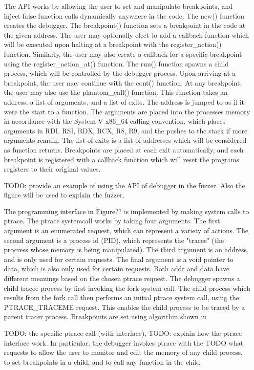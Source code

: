 \documentclass{article} \usepackage{graphicx}
\begin{document}
The API works by allowing the user to set and manipulate breakpoints, and inject
false function calls dynamically anywhere in the code. The new() function
creates the debugger. The breakpoint() function sets a breakpoint in the code at
the given address. The user may optionally elect to add a callback function
which will be executed upon halting at a breakpoint with the register_action()
function. Similarly, the user may also create a callback for a specific
breakpoint using the register_action_at() function. The run() function spawns a
child process, which will be controlled by the debugger process. Upon arriving
at a breakpoint, the user may continue with the cont() function. At any
breakpoint, the user may also use the phantom_call() function. This function
takes an address, a list of arguments, and a list of exits. The address is
jumped to as if it were the start to a function. The arguments are placed into
the processes memory in accordance with the System V x86_64 calling convention,
which places arguments in RDI, RSI, RDX, RCX, R8, R9, and the pushes to the stack if
more arguments remain. The list of exits is a list of addresses which will be
considered as function returns. Breakpoints are placed at each exit
automatically, and each breakpoint is registered with a callback function which
will reset the programs registers to their original values.

TODO: provide an example of using the API of debugger in the fuzzer. Also the
figure will be used to explain the fuzzer.


The programming interface in Figure?? is implemented by making system calls to
ptrace. The ptrace systemcall works by taking four arguments. The first argument
is an enumerated request, which can represent a variety of actions. The second
argument is a process id (PID), which represents the "tracee" (the procress
whose memory is being manipulated). The third argument is an address, and is
only used for certain requests. The final argument is a void pointer to data,
which is also only used for certain requests. Both addr and data have different
meanings based on the chosen ptrace request. The debugger spawns a child tracee
process by first invoking the fork system call. The child process which results
from the fork call then performs an initial ptrace system call, using the
PTRACE_TRACEME request. This enables the child process to be traced by a parent
tracer process. Breakpoints are set using algorithm shown in %

TODO: the specific ptrace call (with interface), TODO: explain how the ptrace
interface work. In particular, the debugger invokes ptrace with the TODO {what
requests} to allow the user to monitor and edit the memory of any child process,
to set breakpoints in a child, and to call any function in the child.
\end{document}
